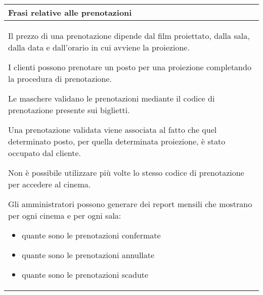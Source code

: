 \begin{tabularx}{\linewidth}{|X|}
      \hline
      \rowcolor{tblhdrcolor}
      \textbf{Frasi relative alle prenotazioni} \\\hline
      Il prezzo di una prenotazione dipende dal film proiettato, dalla
      sala, dalla data e dall'orario in cui avviene la proiezione.

      I clienti possono prenotare un posto per una proiezione
      completando la procedura di prenotazione.

      Le maschere validano le prenotazioni mediante il codice
      di prenotazione presente sui biglietti.

      Una prenotazione validata viene associata al fatto che quel
      determinato posto, per quella determinata proiezione,
      è stato occupato dal cliente.

      Non è possibile utilizzare più volte lo stesso codice di
      prenotazione per accedere al cinema.

      Gli amministratori possono generare dei report mensili che
      mostrano per ogni cinema e per ogni sala:
      \begin{itemize}
            \item quante sono le prenotazioni confermate
            \item quante sono le prenotazioni annullate
            \item quante sono le prenotazioni scadute
      \end{itemize}
      \\ \hline
\end{tabularx}

